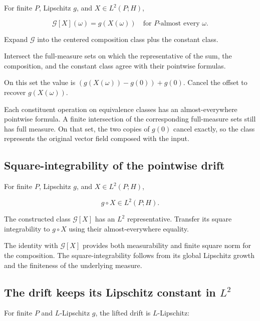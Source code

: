 \documentclass[11pt,a4paper]{article}
\begin{document}
For finite \(P\), Lipschitz \(g\), and \(X\in L^2(P;H)\),

\[\mathcal G[X](\omega)=g(X(\omega))\quad\text{for }P\text{-almost every }\omega.\]

Expand \(\mathcal G\) into the centered composition class plus the constant class.



Intersect the full-measure sets on which the representative of the sum, the composition, and the constant class agree with their pointwise formulas.



On this set the value is \((g(X(\omega))-g(0))+g(0)\). Cancel the offset to recover \(g(X(\omega))\).



Each constituent operation on equivalence classes has an almost-everywhere pointwise formula. A finite intersection of the corresponding full-measure sets still has full measure. On that set, the two copies of \(g(0)\) cancel exactly, so the class represents the original vector field composed with the input.


\subsection{\texorpdfstring{Square-integrability of the pointwise drift}{Square-integrability of the pointwise drift}}


For finite \(P\), Lipschitz \(g\), and \(X\in L^2(P;H)\),

\[g\circ X\in L^2(P;H).\]

The constructed class \(\mathcal G[X]\) has an \(L^2\) representative. Transfer its square integrability to \(g\circ X\) using their almost-everywhere equality.



The identity with \(\mathcal G[X]\) provides both measurability and finite square norm for the composition. The square-integrability follows from its global Lipschitz growth and the finiteness of the underlying measure.


\subsection{\texorpdfstring{The drift keeps its Lipschitz constant in \(L^2\)}{The drift keeps its Lipschitz constant in L²}}


For finite \(P\) and \(L\)-Lipschitz \(g\), the lifted drift is \(L\)-Lipschitz:
\end{document}

